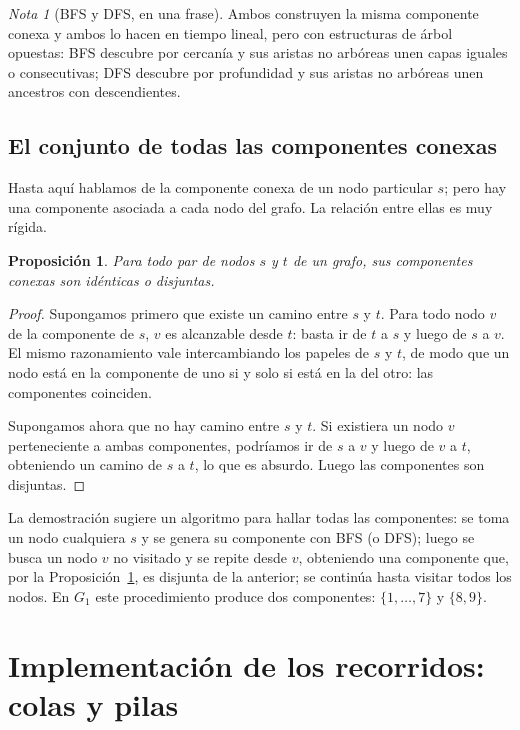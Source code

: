 \documentclass[12pt, spanish, oneside, openany]{book}
\theoremstyle{uprightplain}
\newtheorem{proposicion}[teorema]{Proposición}
\theoremstyle{definition}
\theoremstyle{remark}
\newtheorem{nota}[teorema]{Nota}
\theoremstyle{definition}
\begin{document}
\begin{nota}[BFS y DFS, en una frase]
Ambos construyen la misma componente conexa y ambos lo hacen en tiempo lineal, pero con estructuras de árbol opuestas: BFS descubre por cercanía y sus aristas no arbóreas unen capas iguales o consecutivas; DFS descubre por profundidad y sus aristas no arbóreas unen ancestros con descendientes.
\end{nota}

\subsection{El conjunto de todas las componentes conexas}

Hasta aquí hablamos de la componente conexa de un nodo particular $s$; pero hay una componente asociada a cada nodo del grafo. La relación entre ellas es muy rígida.

\begin{proposicion}
\label{prop:componentes-disjuntas}
Para todo par de nodos $s$ y $t$ de un grafo, sus componentes conexas son idénticas o disjuntas.
\end{proposicion}
\begin{proof}
Supongamos primero que existe un camino entre $s$ y $t$. Para todo nodo $v$ de la componente de $s$, $v$ es alcanzable desde $t$: basta ir de $t$ a $s$ y luego de $s$ a $v$. El mismo razonamiento vale intercambiando los papeles de $s$ y $t$, de modo que un nodo está en la componente de uno si y solo si está en la del otro: las componentes coinciden.

Supongamos ahora que no hay camino entre $s$ y $t$. Si existiera un nodo $v$ perteneciente a ambas componentes, podríamos ir de $s$ a $v$ y luego de $v$ a $t$, obteniendo un camino de $s$ a $t$, lo que es absurdo. Luego las componentes son disjuntas.
\end{proof}

La demostración sugiere un algoritmo para hallar todas las componentes: se toma un nodo cualquiera $s$ y se genera su componente con BFS (o DFS); luego se busca un nodo $v$ no visitado y se repite desde $v$, obteniendo una componente que, por la Proposición~\ref{prop:componentes-disjuntas}, es disjunta de la anterior; se continúa hasta visitar todos los nodos. En $G_1$ este procedimiento produce dos componentes: $\{1,\dots,7\}$ y $\{8,9\}$.

\section{Implementación de los recorridos: colas y pilas}
\label{sec:implementacion}
\end{document}
